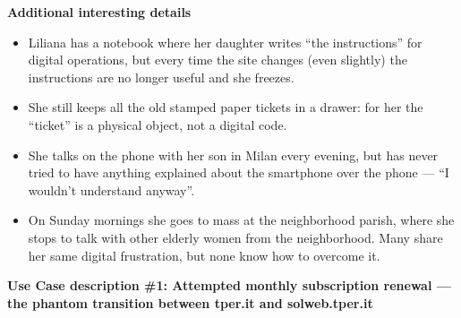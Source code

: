 ﻿\documentclass[11pt,a4paper]{article}
\begin{document}
\vspace{0.3cm}


\begin{tcolorbox}[base,colback=backgroundColor!50]
    \textbf{Additional interesting details} \\[4pt]
    {\small
    \begin{itemize}[leftmargin=*]
        \item Liliana has a notebook where her daughter writes ``the instructions'' for digital operations, but every time the site changes (even slightly) the instructions are no longer useful and she freezes.
        \item She still keeps all the old stamped paper tickets in a drawer: for her the ``ticket'' is a physical object, not a digital code.
        \item She talks on the phone with her son in Milan every evening, but has never tried to have anything explained about the smartphone over the phone --- ``I wouldn't understand anyway''.
        \item On Sunday mornings she goes to mass at the neighborhood parish, where she stops to talk with other elderly women from the neighborhood. Many share her same digital frustration, but none know how to overcome it.
    \end{itemize}
    }
\end{tcolorbox}

\newpage


\begin{tcolorbox}[sectionbox,colback=primaryColor!10]
    \textbf{Use Case description \#1: Attempted monthly subscription renewal --- the phantom transition between tper.it and solweb.tper.it}
\end{tcolorbox}

\vspace{0.3cm}
\end{document}
